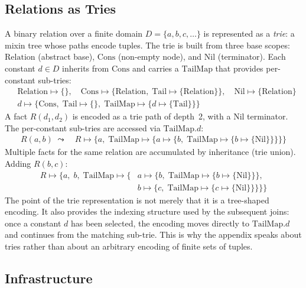 \subsection{Relations as Tries}

A binary relation over a finite domain $D = \{a, b, c, \ldots\}$
is represented as a \emph{trie}: a mixin tree whose paths
encode tuples.
The trie is built from three base scopes:
$\mathrm{Relation}$ (abstract base),
$\mathrm{Cons}$ (non-empty node), and $\mathrm{Nil}$ (terminator).
Each constant $d \in D$ inherits from $\mathrm{Cons}$ and carries
a $\mathrm{TailMap}$ that provides per-constant sub-tries:
\begin{align*}
  &\mathrm{Relation} \mapsto \{\},\quad
  \mathrm{Cons} \mapsto \{\mathrm{Relation},\;
  \mathrm{Tail} \mapsto \{\mathrm{Relation}\}\},\quad
  \mathrm{Nil} \mapsto \{\mathrm{Relation}\}\\[2pt]
  &d \mapsto \{\mathrm{Cons},\;
    \mathrm{Tail} \mapsto \{\},\;
  \mathrm{TailMap} \mapsto \{d \mapsto \{\mathrm{Tail}\}\}\}
\end{align*}
A fact $R(d_1, d_2)$ is encoded as a trie path of depth~2,
with a $\mathrm{Nil}$ terminator.
The per-constant sub-tries are accessed via
$\mathrm{TailMap}.d$:
\begin{align*}
  R(a, b) \;\leadsto\quad
  R \mapsto \{a,\; \mathrm{TailMap} \mapsto \{a \mapsto
  \{b,\; \mathrm{TailMap} \mapsto \{b \mapsto \{\mathrm{Nil}\}\}\}\}\}
\end{align*}
Multiple facts for the same relation are accumulated by
inheritance (trie union).
Adding $R(b, c)$:
\begin{align*}
  R \mapsto \{a,\; b,\;
    \mathrm{TailMap} \mapsto \{&
      a \mapsto \{b,\; \mathrm{TailMap} \mapsto \{b \mapsto \{\mathrm{Nil}\}\}\},\\
  &b \mapsto \{c,\; \mathrm{TailMap} \mapsto \{c \mapsto \{\mathrm{Nil}\}\}\}\}\}
\end{align*}
The point of the trie representation is not merely that it is a
tree-shaped encoding.
It also provides the indexing structure used by the subsequent
joins: once a constant $d$ has been selected, the encoding moves
directly to $\mathrm{TailMap}.d$ and continues from the matching
sub-trie.
This is why the appendix speaks about tries rather than about an
arbitrary encoding of finite sets of tuples.

\subsection{Infrastructure}

